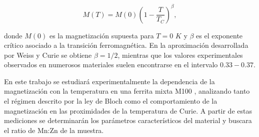 \begin{equation}
M(T)=M(0)\left(1-\frac{T}{T_C}\right)^\beta,
\label{eq:Heisenberg}
\end{equation}

donde $M(0)$ es la magnetización supuesta para $T=0$ $K$ y $\beta$ es el exponente crítico asociado a la transición ferromagnética. En la aproximación desarrollada por Weiss y Curie se obtiene $\beta=1/2$, mientras que los valores experimentales observados en numerosos materiales suelen encontrarse en el intervalo $0.33-0.37$. \cite{Aharoni} \cite{Lue}

En este trabajo se estudiará experimentalmente la dependencia de la magnetización con la temperatura en una ferrita mixta M100 \cite{M100}, analizando tanto el régimen descrito por la ley de Bloch como el comportamiento de la magnetización en las proximidades de la temperatura de Curie. A partir de estas mediciones se determinarán los parámetros característicos del material y buscara el ratio de Mn:Zn de la muestra.
